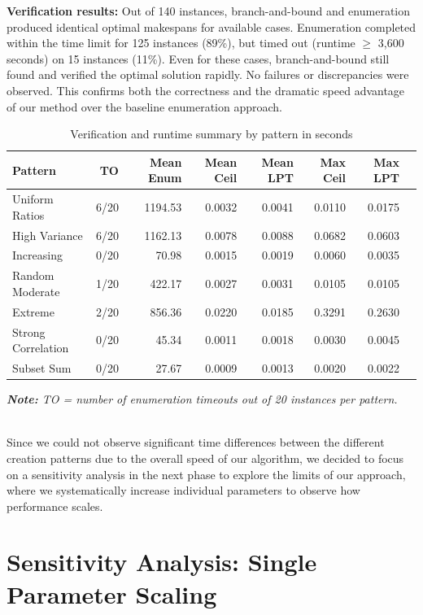 \textbf{Verification results:} Out of 140 instances, branch-and-bound and enumeration produced identical optimal makespans for available cases. Enumeration completed within the time limit for 125 instances (89\%), but timed out (runtime $\geq$ 3,600 seconds) on 15 instances (11\%). Even for these cases, branch-and-bound still found and verified the optimal solution rapidly. No failures or discrepancies were observed. This confirms both the correctness and the dramatic speed advantage of our method over the baseline enumeration approach.


\begin{table}[htbp]
\centering
\caption{Verification and runtime summary by pattern in seconds}
\label{tab:pattern-verification-summary}
\begin{tabular}{lrrrrrrr}
\toprule
Pattern & TO & Mean Enum & Mean Ceil & Mean LPT & Max Ceil & Max LPT \\
\midrule
Uniform Ratios & 6/20 & 1194.53 & 0.0032 & 0.0041 & 0.0110 & 0.0175 \\
High Variance & 6/20 & 1162.13 & 0.0078 & 0.0088 & 0.0682 & 0.0603 \\
Increasing & 0/20 & 70.98 & 0.0015 & 0.0019 & 0.0060 & 0.0035 \\
Random Moderate & 1/20 & 422.17 & 0.0027 & 0.0031 & 0.0105 & 0.0105 \\
Extreme & 2/20 & 856.36 & 0.0220 & 0.0185 & 0.3291 & 0.2630 \\
Strong Correlation & 0/20 & 45.34 & 0.0011 & 0.0018 & 0.0030 & 0.0045 \\
Subset Sum & 0/20 & 27.67 & 0.0009 & 0.0013 & 0.0020 & 0.0022 \\
\bottomrule
\end{tabular}
\end{table}
\begin{minipage}{0.95\linewidth}
\small\textit{\textbf{Note:} TO = number of enumeration timeouts out of 20 instances per pattern.}
\end{minipage}\\[0.5em]

Since we could not observe significant time differences between the different creation patterns due to the overall speed of our algorithm, we decided to focus on a sensitivity analysis in the next phase to explore the limits of our approach, where we systematically increase individual parameters to observe how performance scales.


\section{Sensitivity Analysis: Single Parameter Scaling}


